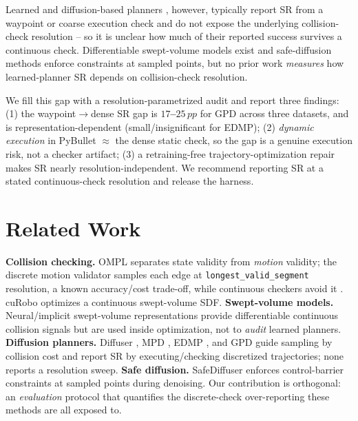 \documentclass[10pt,twocolumn]{article}
\newcommand{\pp}{\,pp}
\begin{document}
Learned and diffusion-based planners \cite{diffuser2022,mpd2023,edmp2024,gpd2025},
however, typically report SR from a waypoint or coarse execution check and do not expose
the underlying collision-check resolution -- so it is unclear how much of their reported
success survives a continuous check. Differentiable swept-volume models exist
\cite{svsdf2024,neuralsvcd2025} and safe-diffusion methods \cite{safediffuser2025} enforce
constraints at sampled points, but no prior work \emph{measures} how learned-planner SR
depends on collision-check resolution.

We fill this gap with a resolution-parametrized audit and report three findings:
(1) the waypoint$\to$dense SR gap is \textbf{$17$--$25\pp$} for GPD across three
datasets, and is representation-dependent (small/insignificant for EDMP); (2)
\emph{dynamic execution} in PyBullet $\approx$ the dense static check, so the gap is a
genuine execution risk, not a checker artifact; (3) a retraining-free
trajectory-optimization repair makes SR nearly resolution-independent. We recommend reporting SR at a stated continuous-check
resolution and release the harness.

\section{Related Work}
\textbf{Collision checking.} OMPL separates state validity from \emph{motion} validity;
the discrete motion validator samples each edge at \texttt{longest\_valid\_segment}
resolution, a known accuracy/cost trade-off, while continuous checkers avoid it
\cite{rrtconnect2000}. cuRobo \cite{curobo2023} optimizes a continuous swept-volume SDF.
\textbf{Swept-volume models.} Neural/implicit swept-volume representations
\cite{svsdf2024,neuralsvcd2025} provide differentiable continuous collision signals but
are used inside optimization, not to \emph{audit} learned planners.
\textbf{Diffusion planners.} Diffuser \cite{diffuser2022}, MPD \cite{mpd2023}, EDMP
\cite{edmp2024}, and GPD \cite{gpd2025} guide sampling by collision cost and report SR by
executing/checking discretized trajectories; none reports a resolution sweep.
\textbf{Safe diffusion.} SafeDiffuser \cite{safediffuser2025} enforces control-barrier
constraints at sampled points during denoising. Our contribution is orthogonal: an
\emph{evaluation} protocol that quantifies the discrete-check over-reporting these
methods are all exposed to.
\end{document}
